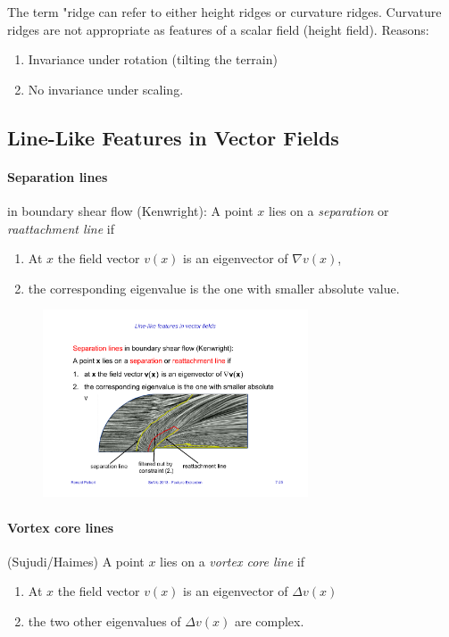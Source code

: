 The term "ridge can refer to either height ridges or curvature ridges. Curvature ridges are not appropriate as features of a scalar field (height field).
Reasons:
\begin{enumerate}
    \item Invariance under rotation  (tilting the terrain)
    \item No invariance under scaling.
\end{enumerate}

\subsection{Line-Like Features in Vector Fields}
\paragraph{Separation lines} in boundary shear flow (Kenwright): A point $x$ lies on a \emph{separation} or \emph{raattachment line} if
\begin{enumerate}
    \item At $x$ the field vector $v(x)$ is an eigenvector of $\nabla v(x)$,
    \item the corresponding eigenvalue is the one with smaller absolute value. 
\end{enumerate}
\begin{figure}[H]
    \centering
    \includegraphics[width=0.7\textwidth]{img/07_separation_lines}
\end{figure}

\paragraph{Vortex core lines} (Sujudi/Haimes) A point $x$ lies on a \emph{vortex core line} if
\begin{enumerate}
    \item At $x$ the field vector $v(x)$ is an eigenvector of $\Delta v(x)$
    \item the two other eigenvalues of $\Delta v(x)$ are complex.
\end{enumerate}

